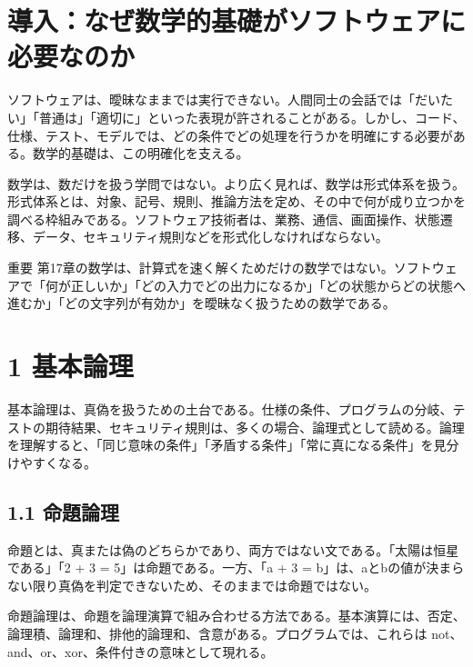 \documentclass[uplatex,dvipdfmx,a4paper,10pt]{jsarticle}
\begin{document}
\section{導入：なぜ数学的基礎がソフトウェアに必要なのか}
ソフトウェアは、曖昧なままでは実行できない。人間同士の会話では「だいたい」「普通は」「適切に」といった表現が許されることがある。しかし、コード、仕様、テスト、モデルでは、どの条件でどの処理を行うかを明確にする必要がある。数学的基礎は、この明確化を支える。

数学は、数だけを扱う学問ではない。より広く見れば、数学は形式体系を扱う。形式体系とは、対象、記号、規則、推論方法を定め、その中で何が成り立つかを調べる枠組みである。ソフトウェア技術者は、業務、通信、画面操作、状態遷移、データ、セキュリティ規則などを形式化しなければならない。

\begin{infobox}{重要}
第17章の数学は、計算式を速く解くためだけの数学ではない。ソフトウェアで「何が正しいか」「どの入力でどの出力になるか」「どの状態からどの状態へ進むか」「どの文字列が有効か」を曖昧なく扱うための数学である。
\end{infobox}
\section{1 基本論理}
基本論理は、真偽を扱うための土台である。仕様の条件、プログラムの分岐、テストの期待結果、セキュリティ規則は、多くの場合、論理式として読める。論理を理解すると、「同じ意味の条件」「矛盾する条件」「常に真になる条件」を見分けやすくなる。

\subsection{1.1 命題論理}
命題とは、真または偽のどちらかであり、両方ではない文である。「太陽は恒星である」「2 + 3 = 5」は命題である。一方、「a + 3 = b」は、aとbの値が決まらない限り真偽を判定できないため、そのままでは命題ではない。

命題論理は、命題を論理演算で組み合わせる方法である。基本演算には、否定、論理積、論理和、排他的論理和、含意がある。プログラムでは、これらは not、and、or、xor、条件付きの意味として現れる。
\end{document}
